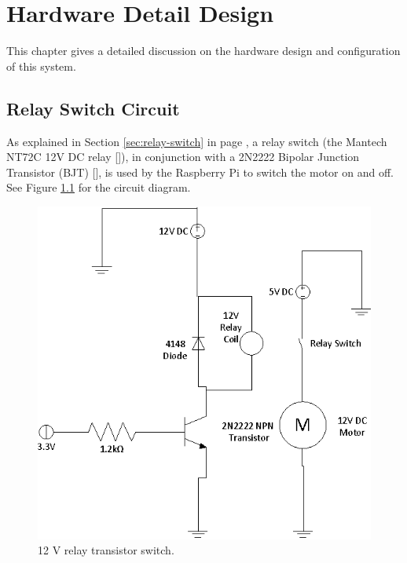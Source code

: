 \chapter{Hardware Detail Design}
\label{chap:5}

This chapter gives a detailed discussion on the hardware design and
configuration of this system. 


\section{Relay Switch Circuit}
\label{sec:detail-switch}

As explained in Section \ref{sec:relay-switch} in page \pageref{sec:relay-switch}, a relay
switch (the Mantech NT72C 12V DC relay [\cite{manual:relay-specs}]), in conjunction with a 2N2222
Bipolar Junction Transistor (BJT) [\cite{maunual:transistor-datasheet}], is used
by the Raspberry Pi to switch the motor on and off. See Figure
\ref{fig:relay-switch} for the circuit diagram.

\begin{figure}
\centering
\includegraphics[scale=0.7]{relay_switch.eps}
\caption{12 V relay transistor switch.}
\label{fig:relay-switch}
\end{figure}

